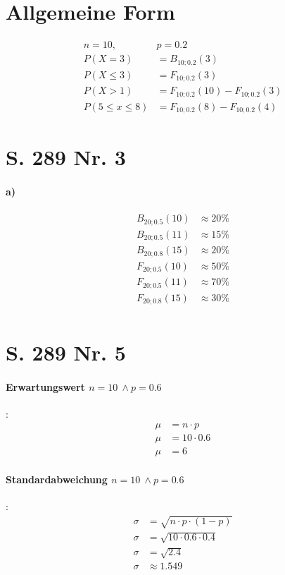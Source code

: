 \documentclass[12pt,a4paper]{report}
\begin{document}
	\section{Allgemeine Form}
	\begin{align*}
		n = 10,\ &p = 0.2 \\
		P(X=3) &= B_{10;0.2}(3) \\
		P(X\leq 3) &= F_{10;0.2}(3) \\
		P(X > 1) &= F_{10;0.2}(10) - F_{10;0.2}(3) \\
		P(5 \leq x \leq 8) &= F_{10;0.2}(8) - F_{10;0.2}(4)
	\end{align*}
	\section{S. 289 Nr. 3}
	\paragraph{a)}
	\begin{align*}
		B_{20;0.5}(10) &\approx 20 \% \\
		B_{20;0.5}(11) &\approx 15 \% \\
		B_{20;0.8}(15) &\approx 20 \% \\
		F_{20;0.5}(10) &\approx 50 \% \\
		F_{20;0.5}(11) &\approx 70 \% \\
		F_{20;0.8}(15) &\approx 30 \% \\
	\end{align*}
	\section{S. 289 Nr. 5}
	\paragraph{Erwartungswert $n=10\ \land p=0.6$}:
	\begin{align*}
		\mu &= n\cdot p \\
		\mu &= 10 \cdot 0.6 \\
		\mu &= 6
	\end{align*}
	\paragraph{Standardabweichung $n=10\ \land p=0.6$}:
	\begin{align*}
		\sigma &= \sqrt{n\cdot p\cdot(1-p)} \\
		\sigma &= \sqrt{10 \cdot 0.6 \cdot 0.4} \\
		\sigma &= \sqrt{2.4} \\
		\sigma &\approx 1.549
	\end{align*}
\end{document}
